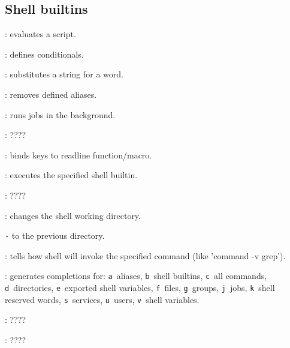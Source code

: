 %

\subsection{Shell builtins}
\begin{compactenum}
\item [\symbolbash] : evaluates a script.

\item [\symbolbash] \commandbash{[}: defines conditionals.

\item [\symbolbash] : substitutes a string for a word.
\item [\symbolbash] : removes defined aliases.

\item [\symbolbash] : runs jobs in the background.
\item [\symbolbash] : \dotfill ????

\item [\symbolbash] : binds keys to readline function/macro.

\item [\symbolbash] : executes the specified shell builtin.

\item [\symbolbash] : \dotfill ????

\item [\symbolbash] : changes the shell working directory.
\item [\texttt{-}] to the previous directory.

\item [\symbolbash] : tells how shell will invoke the specified command (like 'command -v grep').

\item [\symbolbash] : generates completions for: \texttt{a}~aliases, \texttt{b}~shell builtins, \texttt{c}~all commands, \texttt{d}~directories, \texttt{e}~exported shell variables, \texttt{f}~files, \texttt{g}~groups, \texttt{j}~jobs, \texttt{k}~shell reserved words, \texttt{s}~services, \texttt{u}~users, \texttt{v}~shell variables.

\item [\symbolbash] : \dotfill ????

\item [\symbolbash] : \dotfill ????



\end{compactenum}
